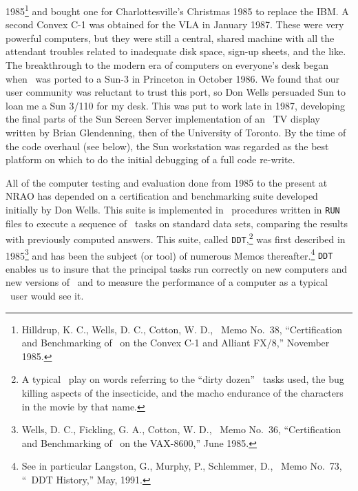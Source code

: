 1985\footnote{Hilldrup, K. C., Wells, D. C., Cotton, W. D., \AIPS\
Memo No.~38, ``Certification and Benchmarking of \AIPS\ on the Convex
C-1 and Alliant FX/8,'' November 1985.} and bought one for
Charlottesville's Christmas 1985 to replace the \hbox{IBM}.  A second
Convex C-1 was obtained for the VLA in January 1987.  These were very
powerful computers, but they were still a central, shared machine with
all the attendant troubles related to inadequate disk space, sign-up
sheets, and the like.  The breakthrough to the modern era of
computers on everyone's desk began when \AIPS\ was ported to a Sun-3
in Princeton in October 1986.  We found that our user community was
reluctant to trust this port, so Don Wells persuaded Sun to loan me a
Sun 3/110 for my desk.  This was put to work late in 1987, developing
the final parts of the Sun Screen Server implementation of an \AIPS\ TV
display written by Brian Glendenning, then of the University of
Toronto.  By the time of the code overhaul (see below), the Sun
workstation was regarded as the best platform on which to do the
initial debugging of a full code re-write.

All of the computer testing and evaluation done from 1985 to the
present at NRAO has depended on a certification and benchmarking suite
developed initially by Don Wells.  This suite is implemented in \AIPS\
procedures written in {\tt RUN} files to execute a sequence of \AIPS\
tasks on standard data sets, comparing the results with previously
computed answers.  This suite, called {\tt DDT},\footnote{A typical
\AIPS\ play on words referring to the ``dirty dozen'' \AIPS\ tasks
used, the bug killing aspects of the insecticide, and the macho
endurance of the characters in the movie by that name.} was first
described in 1985\footnote{Wells, D. C., Fickling, G. A., Cotton, W.
D., \AIPS\ Memo No.~36, ``Certification and Benchmarking of \AIPS\ on
the VAX-8600,'' June 1985.} and has been the subject (or tool) of
numerous Memos thereafter.\footnote{See in particular Langston, G.,
Murphy, P., Schlemmer, D., \AIPS\ Memo No.~73, ``\AIPS\ DDT History,''
May, 1991.}  {\tt DDT} enables us to insure that the principal tasks
run correctly on new computers and new versions of \AIPS\ and to
measure the performance of a computer as a typical \AIPS\ user would
see it.

